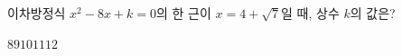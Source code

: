 이차방정식 $x^2-8x+k=0$의 한 근이 $x=4+\sqrt{7}$일 때, 상수 $k$의 값은?
\begin{choices32}{$8$}{$9$}{$10$}{$11$}{$12$}\end{choices32}
